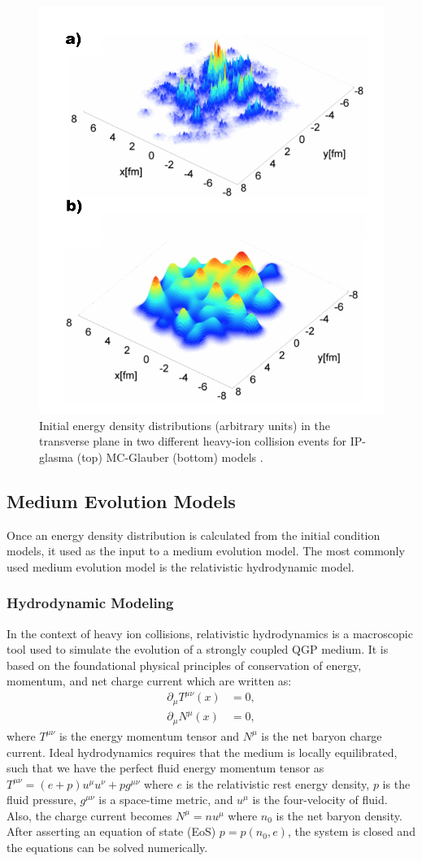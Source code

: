 \begin{figure}[h!]
\begin{center}
\includegraphics[width=0.45\linewidth]{figs/initial_conditions.png}
\caption{ Initial energy density distributions (arbitrary units) in the transverse plane in two different heavy-ion collision events for IP-glasma (top)  MC-Glauber (bottom) models \cite{PhysRevLett.108.252301}.}
\label{fig:ipg_mcg_comp}
\end{center}
\end{figure}

\subsection{Medium Evolution Models}
Once an energy density distribution is calculated from the initial condition models, it used as the input to a medium evolution model. The most commonly used medium evolution model is the relativistic hydrodynamic model.

\subsubsection{Hydrodynamic Modeling}%
In the context of heavy ion collisions, relativistic hydrodynamics is a macroscopic tool used to simulate the evolution of a strongly coupled QGP medium. It is based on the foundational physical principles of conservation of energy, momentum, and net charge current which are written as:
\begin{align}
\partial_{\mu} T^{\mu\nu}(x) &= 0,\\
\partial_{\mu} N^{\mu}(x) &= 0,
\end{align}
where $T^{\mu\nu}$ is the energy momentum tensor and $N^{\mu}$ is the net baryon charge current. Ideal hydrodynamics requires that the medium is locally equilibrated, such that we have the perfect fluid energy momentum tensor as $T^{\mu\nu} = (e+p)u^\mu u^\nu+pg^{\mu\nu}$ where $e$ is the relativistic rest energy density, $p$ is the fluid pressure, $g^{\mu\nu}$ is a space-time metric, and $u^\mu$ is the four-velocity of fluid. Also, the charge current becomes $N^\mu = nu^\mu$ where $n_0$ is the net baryon density. After asserting an equation of state (EoS) $p = p(n_0,e)$, the system is closed and the equations can be solved numerically.

